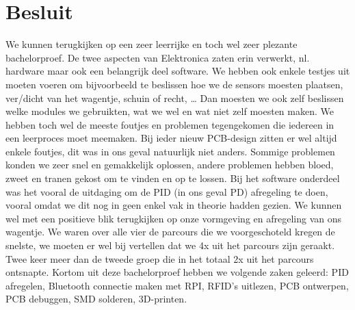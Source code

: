 \chapter{Besluit}
We kunnen terugkijken op een zeer leerrijke en toch wel zeer plezante bachelorproef. De twee aspecten van Elektronica zaten erin verwerkt, nl. hardware maar ook een belangrijk deel software. We hebben ook enkele testjes uit moeten voeren om bijvoorbeeld te beslissen hoe we de sensors moesten plaatsen, ver/dicht van het wagentje, schuin of recht, … Dan moesten we ook zelf beslissen welke modules we gebruikten, wat we wel en wat niet zelf moesten maken. We hebben toch wel de meeste foutjes en problemen tegengekomen die iedereen in een leerproces moet meemaken. Bij ieder nieuw PCB-design zitten er wel altijd enkele foutjes, dit was in ons geval natuurlijk niet anders. Sommige problemen konden we zeer snel en gemakkelijk oplossen, andere problemen hebben bloed, zweet en tranen gekost om te vinden en op te lossen. Bij het software onderdeel was het vooral de uitdaging om de PID (in ons geval PD) afregeling te doen, vooral omdat we dit nog in geen enkel vak in theorie hadden gezien. We kunnen wel met een positieve blik terugkijken op onze vormgeving en afregeling van ons wagentje. We waren over alle vier de parcours die we voorgeschoteld kregen de snelste, we moeten er wel bij vertellen dat we 4x uit het parcours zijn geraakt. Twee keer meer dan de tweede groep die in het totaal 2x uit het parcours ontsnapte. Kortom uit deze bachelorproef hebben we volgende zaken geleerd: PID afregelen, Bluetooth connectie maken met RPI, RFID’s uitlezen, PCB ontwerpen, PCB debuggen, SMD solderen, 3D-printen. 
